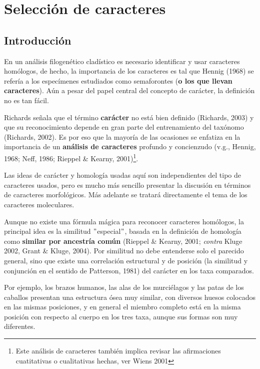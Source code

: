 \chapter{Selecci\'on de caracteres}
\section*{Introducci\'on}

En un an\'alisis filogen\'etico clad\'istico es necesario identificar y usar caracteres hom\'ologos, de hecho, la importancia de los caracteres es tal que Hennig (1968) se refer\'ia a los espec\'imenes estudiados como semaforontes (\textbf{o los que llevan caracteres}). A\'un a pesar del papel central del concepto de car\'acter, la definici\'on no es tan f\'acil.


Richards se\~nala que el t\'ermino \textbf{car\'acter} no est\'a 
bien definido (Richards, 2003) y que su reconocimiento depende en 
gran parte del entrenamiento del tax\'onomo (Richards, 2002). Es por 
eso que la mayor\'ia de las ocasiones se enfatiza en la importancia 
de un \textbf{an\'alisis de caracteres} profundo y concienzudo 
(v.g., Hennig, 1968; Neff, 1986; Rieppel \& Kearny, 2001)\footnote
{Este an\'alisis de caracteres tambi\'en implica revisar las 
afirmaciones cuatitativas o cualitativas hechas, ver Wiens 2001 
}.

Las ideas de car\'acter y homolog\'ia usadas aqu\'i 
son independientes del tipo de caracteres usados, pero es mucho m\'as 
sencillo presentar la discusi\'on en t\'erminos de caracteres 
morfol\'ogicos. M\'as adelante se tratar\'a directamente el tema de los 
caracteres moleculares. 

Aunque no existe una f\'ormula m\'agica para reconocer caracteres hom\'ologos, 
la principal idea es la similitud $"$especial$"$, basada en 
la definici\'on de homolog\'ia como \textbf {similar por ancestr\'ia 
com\'un} (Rieppel \& Kearny, 2001; \textit {contra} Kluge 2002, 
Grant \& Kluge, 2004). Por similitud no debe entenderse solo el 
parecido general, sino que existe una correlaci\'on estructural y de 
posici\'on (la similitud y conjunci\'on en el sentido de Patterson, 
1981) del car\'acter en los taxa comparados. 

Por ejemplo, los brazos humanos, las alas de los murci\'elagos y las 
patas de los caballos presentan una estructura \'osea muy similar, 
con diversos huesos colocados en las mismas posiciones, y en general 
el miembro completo est\'a en la misma posici\'on con respecto al 
cuerpo en los tres taxa, aunque sus formas son muy diferentes. 


